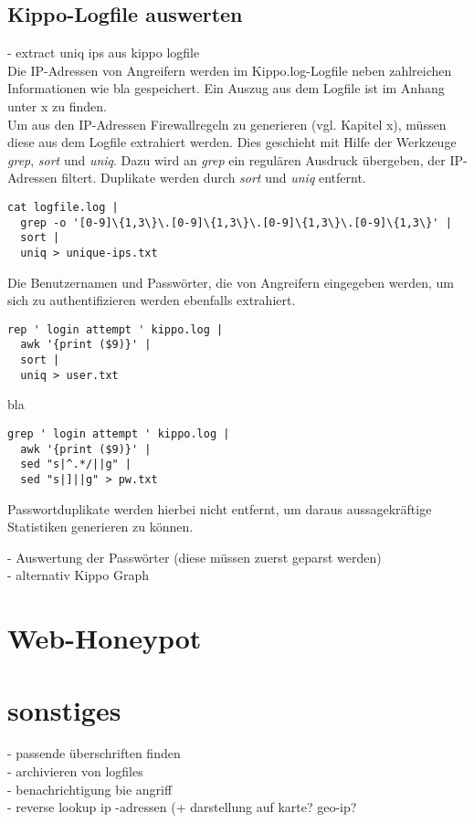 \subsection{Kippo-Logfile auswerten}
\label{subsec:Kippo-Logfile auswerten}

- extract uniq ips aus kippo logfile \\

Die IP-Adressen von Angreifern werden im Kippo.log-Logfile neben zahlreichen Informationen wie bla %
gespeichert. Ein Auszug aus dem Logfile ist im Anhang unter x zu finden.\\

Um aus den IP-Adressen Firewallregeln zu generieren (vgl. Kapitel x), müssen diese aus dem Logfile extrahiert werden. Dies geschieht mit Hilfe der Werkzeuge \textit{grep}, \textit{sort} und \textit{uniq}. Dazu wird an \textit{grep} ein regulären Ausdruck übergeben, der IP-Adressen filtert. Duplikate werden durch \textit{sort} und \textit{uniq} entfernt.

\begin{lstlisting}[style=customc]
cat logfile.log | 
  grep -o '[0-9]\{1,3\}\.[0-9]\{1,3\}\.[0-9]\{1,3\}\.[0-9]\{1,3\}' |
  sort |
  uniq > unique-ips.txt
\end{lstlisting}

Die Benutzernamen und Passwörter, die von Angreifern eingegeben werden, um sich zu authentifizieren werden ebenfalls extrahiert.


\begin{lstlisting}[style=customc]
rep ' login attempt ' kippo.log |
  awk '{print ($9)}' |
  sort |
  uniq > user.txt
\end{lstlisting}

bla

\begin{lstlisting}[style=customc]
grep ' login attempt ' kippo.log |
  awk '{print ($9)}' |
  sed "s|^.*/||g" |
  sed "s|]||g" > pw.txt
\end{lstlisting}

Passwortduplikate werden hierbei nicht entfernt, um daraus aussagekräftige Statistiken generieren zu können.


- Auswertung der Passwörter (diese müssen zuerst geparst werden)\\
- alternativ Kippo Graph

\section{Web-Honeypot}
\label{sec:Web-Honeypot}


\section{sonstiges}
\label{sec:sonstiges}

- passende überschriften finden\\
- archivieren von logfiles\\
- benachrichtigung bie angriff\\
- reverse lookup ip -adressen (+ darstellung auf karte? geo-ip?\\

